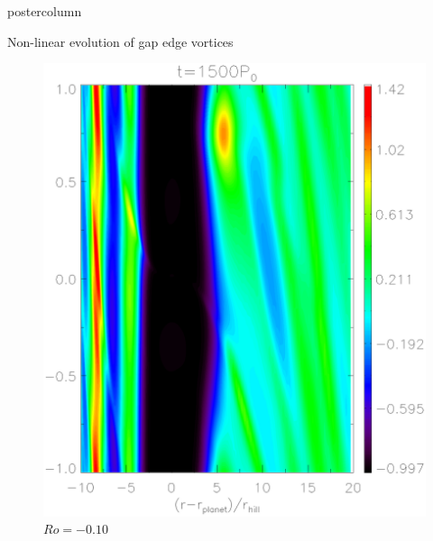 \documentclass[final,hyperref={pdfpagelabels=false}]{beamer}
\begin{document}
\begin{frame}
\begin{columns}
\begin{column}{.49\textwidth}
\begin{beamercolorbox}[center,wd=\textwidth]{postercolumn}
\begin{minipage}[T]{.95\textwidth}
{\begin{block}{\Large{Non-linear evolution of gap edge
                  vortices}}
\begin{figure}
\begin{minipage}{0.3\textwidth}
                      \includegraphics[width=\textwidth]{Posterfig_After}
                      \caption{$Ro=-0.10$}
                    \end{minipage}
                    \hfill
                  \end{figure}

            \end{block}

}
\end{minipage}
\end{beamercolorbox}
\end{column}
\end{columns}
\end{frame}
\end{document}

